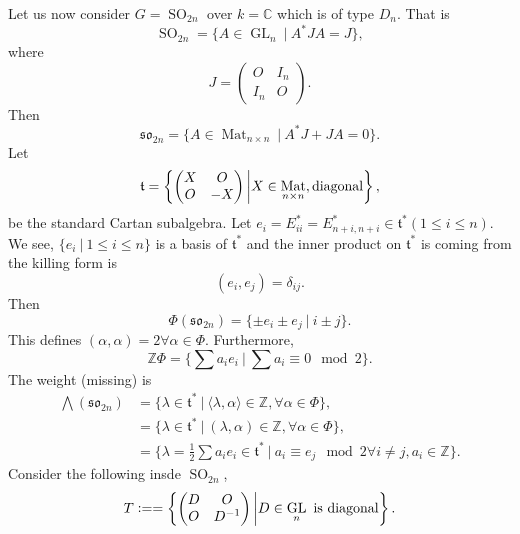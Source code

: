\documentclass[10pt]{article}
\numberwithin{equation}{theorem}
\DeclareMathOperator{\GL}{GL}
\DeclareMathOperator{\SO}{SO}
\DeclareMathOperator{\Mat}{Mat}
\newcommand{\defeq}{\vcentcolon=}
\newcommand{\Z}[0]{\mathbb{Z}}
\newcommand{\C}[0]{\mathbb{C}}
\newcommand{\tl}[0]{\mathfrak{t}}
\newcommand{\so}[0]{\mathfrak{so}}
\newcommand{\sep}[0]{\:|\:}
\begin{document}
  Let us now consider $G = \SO_{2n}$ over $k=\C$ which is of type $D_n$. That is 
  \begin{equation*}
    \SO_{2n} = \{A\in \GL_n\sep A^*JA = J\},
  \end{equation*}
  where 
  \begin{equation*}
    J=
    \begin{pmatrix}
      O & I_n\\
      I_n & O
    \end{pmatrix}.
  \end{equation*}
  Then 
  \begin{equation*}
    \so_{2n} = \{A\in\Mat_{n\times n} \sep A^*J +JA = 0\}.
  \end{equation*}
  Let 
  \begin{equation*}
    \tl = \left\{\begin{pmatrix}
      X & O\\
      O& -X
    \end{pmatrix}
    \bigg{|}X\in\Mat_{n\times n}, \text{diagonal}\right\},
  \end{equation*}
  be the standard Cartan subalgebra. Let $e_i = E_{ii}^* = E_{n+i,n+i}^*\in\tl^* (1\leq i\leq n)$.
  We see, $\{e_i\sep 1\leq i\leq n\}$ is a basis of $\tl^*$ and the inner product on $\tl^*$ is coming from the killing form is 
  \begin{equation*}
    (e_i,e_j) = \delta_{ij}.
  \end{equation*}
  Then 
  \begin{equation*}
    \Phi(\so_{2n}) = \{\pm e_i\pm e_j\sep i\pm j\}.
  \end{equation*}
  This defines $(\alpha,\alpha) = 2\forall \alpha\in \Phi$. Furthermore,
  \begin{equation*}
    \Z\Phi = \{\sum a_ie_i\sep \sum a_i \equiv 0\mod{2}\}.
  \end{equation*}
  The weight (missing) is 
  \begin{align*}
    \bigwedge(\so_{2n}) & = \{\lambda\in\tl^*\sep \langle\lambda,\alpha\rangle\in\Z,\forall\alpha\in\Phi\},\\
    & = \{\lambda\in\tl^*\sep (\lambda,\alpha)\in\Z,\forall \alpha\in\Phi\},\\
    & = \{\lambda = {\frac 1 2}\sum a_ie_i\in\tl^*\sep a_i\equiv e_j\mod{2}\forall i\not=j, a_i\in\Z\}.
  \end{align*}
  Consider the following insde $\SO_{2n}$,
  \begin{equation*}
    T\defeq = \left\{\begin{pmatrix}
      D & O\\
      O & D^{-1}
    \end{pmatrix}
    \bigg{|}D\in\GL_n \text{ is diagonal}\right\}.
  \end{equation*}
\end{document}
